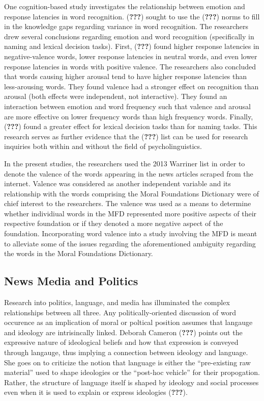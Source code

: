 \documentclass[,man]{apa6}
\theoremstyle{definition}
\theoremstyle{definition}
\theoremstyle{definition}
\theoremstyle{remark}
\begin{document}
One cognition-based study investigates the relationship between emotion
and response latencies in word recognition. ({\textbf{???}}) sought to
use the ({\textbf{???}}) norms to fill in the knowledge gaps regarding
variance in word recognition. The researchers drew several conclusions
regarding emotion and word recognition (specifically in naming and
lexical decision tasks). First, ({\textbf{???}}) found higher response
latencies in negative-valence words, lower response latencies in neutral
words, and even lower response latencies in words with positive valence.
The researchers also concluded that words causing higher arousal tend to
have higher response latencies than less-arousing words. They found
valence had a stronger effect on recognition than arousal (both effects
were independent, not interactive). They found an interaction between
emotion and word frequency such that valence and arousal are more
effective on lower frequency words than high frequency words. Finally,
({\textbf{???}}) found a greater effect for lexical decision tasks than
for naming tasks. This research serves as further evidence that the
({\textbf{???}}) list can be used for research inquiries both within and
without the field of psycholinguistics.

In the present studies, the researchers used the 2013 Warriner list in
order to denote the valence of the words appearing in the news articles
scraped from the internet. Valence was considered as another independent
variable and its relationship with the words comprising the Moral
Foundations Dictionary were of chief interest to the researchers. The
valence was used as a means to determine whether individiual words in
the MFD represented more positive aspects of their respective foundation
or if they denoted a more negative aspect of the foundation.
Incorporating word valence into a study involving the MFD is meant to
alleviate some of the issues regarding the aforementioned ambiguity
regarding the words in the Moral Foundations Dictionary.

\hypertarget{news-media-and-politics}{%
\subsection{News Media and Politics}\label{news-media-and-politics}}

Research into politics, language, and media has illuminated the complex
relationships between all three. Any politically-oriented discussion of
word occurence as an implication of moral or poltical position assumes
that langauge and ideology are intrisincally linked. Deborah Cameron
({\textbf{???}}) points out the expressive nature of ideological beliefs
and how that expression is conveyed through langauge, thus implying a
connection between ideology and language. She goes on to criticize the
notion that language is either the \enquote{pre-existing raw material}
used to shape ideologies or the \enquote{post-hoc vehicle} for their
propogation. Rather, the structure of language itself is shaped by
ideology and social processes even when it is used to explain or express
ideologies ({\textbf{???}}).
\end{document}
